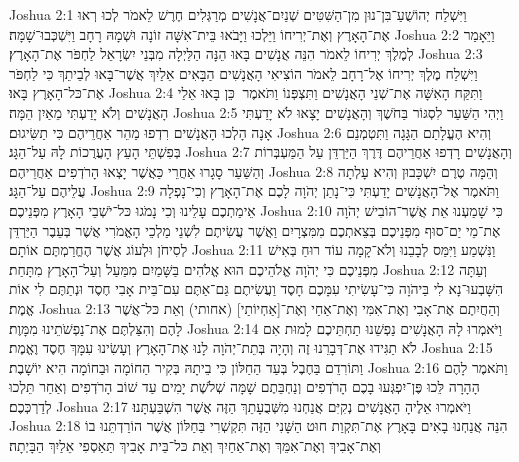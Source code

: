 Joshua 2:1	וַיִּשְׁלַח יְהוֹשֻׁעַ־בִּן־נוּן מִן־הַשִּׁטִּים שְׁנַיִם־אֲנָשִׁים מְרַגְּלִים חֶרֶשׁ לֵאמֹר לְכוּ רְאוּ אֶת־הָאָרֶץ וְאֶת־יְרִיחוֹ וַיֵּלְכוּ וַיָּבֹאוּ בֵּית־אִשָּׁה זוֹנָה וּשְׁמָהּ רָחָב וַיִּשְׁכְּבוּ־שָׁמָּה׃
Joshua 2:2	וַיֵּאָמַר לְמֶלֶךְ יְרִיחוֹ לֵאמֹר הִנֵּה אֲנָשִׁים בָּאוּ הֵנָּה הַלַּיְלָה מִבְּנֵי יִשְׂרָאֵל לַחְפֹּר אֶת־הָאָרֶץ׃
Joshua 2:3	וַיִּשְׁלַח מֶלֶךְ יְרִיחוֹ אֶל־רָחָב לֵאמֹר הוֹצִיאִי הָאֲנָשִׁים הַבָּאִים אֵלַיִךְ אֲשֶׁר־בָּאוּ לְבֵיתֵךְ כִּי לַחְפֹּר אֶת־כּל־הָאָרֶץ בָּאוּ׃
Joshua 2:4	וַתִּקַּח הָאִשָּׁה אֶת־שְׁנֵי הָאֲנָשִׁים וַתִּצְפְּנוֹ וַתֹּאמֶר  כֵּן בָּאוּ אֵלַי הָאֲנָשִׁים וְלֹא יָדַעְתִּי מֵאַיִן הֵמָּה׃
Joshua 2:5	וַיְהִי הַשַּׁעַר לִסְגּוֹר בַּחֹשֶׁךְ וְהָאֲנָשִׁים יָצָאוּ לֹא יָדַעְתִּי אָנָה הָלְכוּ הָאֲנָשִׁים רִדְפוּ מַהֵר אַחֲרֵיהֶם כִּי תַשִּׂיגוּם׃
Joshua 2:6	וְהִיא הֶעֱלָתַם הַגָּגָה וַתִּטְמְנֵם בְּפִשְׁתֵּי הָעֵץ הָעֲרֻכוֹת לָהּ עַל־הַגָּג׃
Joshua 2:7	וְהָאֲנָשִׁים רָדְפוּ אַחֲרֵיהֶם דֶּרֶךְ הַיַּרְדֵּן עַל הַמַּעְבְּרוֹת וְהַשַּׁעַר סָגָרוּ אַחֲרֵי כַּאֲשֶׁר יָצְאוּ הָרֹדְפִים אַחֲרֵיהֶם׃
Joshua 2:8	וְהֵמָּה טֶרֶם יִשְׁכָּבוּן וְהִיא עָלְתָה עֲלֵיהֶם עַל־הַגָּג׃
Joshua 2:9	וַתֹּאמֶר אֶל־הָאֲנָשִׁים יָדַעְתִּי כִּי־נָתַן יְהֹוָה לָכֶם אֶת־הָאָרֶץ וְכִי־נָפְלָה אֵימַתְכֶם עָלֵינוּ וְכִי נָמֹגוּ כּל־יֹשְׁבֵי הָאָרֶץ מִפְּנֵיכֶם׃
Joshua 2:10	כִּי שָׁמַעְנוּ אֵת אֲשֶׁר־הוֹבִישׁ יְהֹוָה אֶת־מֵי יַם־סוּף מִפְּנֵיכֶם בְּצֵאתְכֶם מִמִּצְרָיִם וַאֲשֶׁר עֲשִׂיתֶם לִשְׁנֵי מַלְכֵי הָאֱמֹרִי אֲשֶׁר בְּעֵבֶר הַיַּרְדֵּן לְסִיחֹן וּלְעוֹג אֲשֶׁר הֶחֱרַמְתֶּם אוֹתָם׃
Joshua 2:11	וַנִּשְׁמַע וַיִּמַּס לְבָבֵנוּ וְלֹא־קָמָה עוֹד רוּחַ בְּאִישׁ מִפְּנֵיכֶם כִּי יְהֹוָה אֱלֹהֵיכֶם הוּא אֱלֹהִים בַּשָּׁמַיִם מִמַּעַל וְעַל־הָאָרֶץ מִתָּחַת׃
Joshua 2:12	וְעַתָּה הִשָּׁבְעוּ־נָא לִי בַּיהֹוָה כִּי־עָשִׂיתִי עִמָּכֶם חָסֶד וַעֲשִׂיתֶם גַּם־אַתֶּם עִם־בֵּית אָבִי חֶסֶד וּנְתַתֶּם לִי אוֹת אֱמֶת׃
Joshua 2:13	וְהַחֲיִתֶם אֶת־אָבִי וְאֶת־אִמִּי וְאֶת־אַחַי וְאֶת־[אַחְיוֹתַי] (אחותי) וְאֵת כּל־אֲשֶׁר לָהֶם וְהִצַּלְתֶּם אֶת־נַפְשֹׁתֵינוּ מִמָּוֶת׃
Joshua 2:14	וַיֹּאמְרוּ לָהּ הָאֲנָשִׁים נַפְשֵׁנוּ תַחְתֵּיכֶם לָמוּת אִם לֹא תַגִּידוּ אֶת־דְּבָרֵנוּ זֶה וְהָיָה בְּתֵת־יְהֹוָה לָנוּ אֶת־הָאָרֶץ וְעָשִׂינוּ עִמָּךְ חֶסֶד וֶאֱמֶת׃
Joshua 2:15	וַתּוֹרִדֵם בַּחֶבֶל בְּעַד הַחַלּוֹן כִּי בֵיתָהּ בְּקִיר הַחוֹמָה וּבַחוֹמָה הִיא יוֹשָׁבֶת׃
Joshua 2:16	וַתֹּאמֶר לָהֶם הָהָרָה לֵּכוּ פֶּן־יִפְגְּעוּ בָכֶם הָרֹדְפִים וְנַחְבֵּתֶם שָׁמָּה שְׁלֹשֶׁת יָמִים עַד שׁוֹב הָרֹדְפִים וְאַחַר תֵּלְכוּ לְדַרְכְּכֶם׃
Joshua 2:17	וַיֹּאמְרוּ אֵלֶיהָ הָאֲנָשִׁים נְקִיִּם אֲנַחְנוּ מִשְּׁבֻעָתֵךְ הַזֶּה אֲשֶׁר הִשְׁבַּעְתָּנוּ׃
Joshua 2:18	הִנֵּה אֲנַחְנוּ בָאִים בָּאָרֶץ אֶת־תִּקְוַת חוּט הַשָּׁנִי הַזֶּה תִּקְשְׁרִי בַּחַלּוֹן אֲשֶׁר הוֹרַדְתֵּנוּ בוֹ וְאֶת־אָבִיךְ וְאֶת־אִמֵּךְ וְאֶת־אַחַיִךְ וְאֵת כּל־בֵּית אָבִיךְ תַּאַסְפִי אֵלַיִךְ הַבָּיְתָה׃
